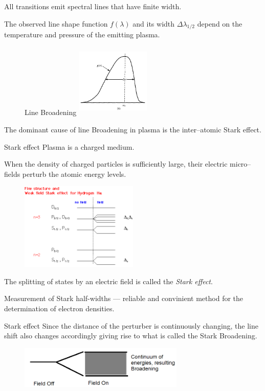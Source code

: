 \documentclass[final]{beamer}
\begin{document}
\begin{frame}
  All transitions emit spectral lines that have finite width.
  
  The observed line shape function $f(\lambda)$ and its width $\Delta \lambda_{1/2}$ depend on the temperature and pressure of the emitting plasma.
\begin{figure}{Line Broadening}
  \includegraphics[width=100pt,height=100pt]{figures/lineshape.PNG}
\end{figure}
The dominant cause of line Broadening in plasma is the inter--atomic Stark effect.
\end{frame}
\begin{frame}{Stark effect}
  Plasma is a charged medium.

  When the density of charged particles is sufficiently large, their electric micro--fields perturb the atomic energy levels.
  \begin{figure}
    \includegraphics[width=0.5\textwidth]{figures/stark_effect_1.png}
  \end{figure}
  The splitting of states by an electric field is called the \emph{Stark effect}.

  Measurement of Stark half-widths --- reliable and convinient method for the determination of electron densities.
  \end{frame}
  \begin{frame}{Stark effect}
    Since the distance of the perturber is continuously changing, the line shift also changes accordingly giving rise to what is called the Stark Broadening.
    \begin{figure}
      \includegraphics[width=0.7\textwidth]{figures/stark_effect_2.png}
    \end{figure}
  \end{frame}
\end{document}
